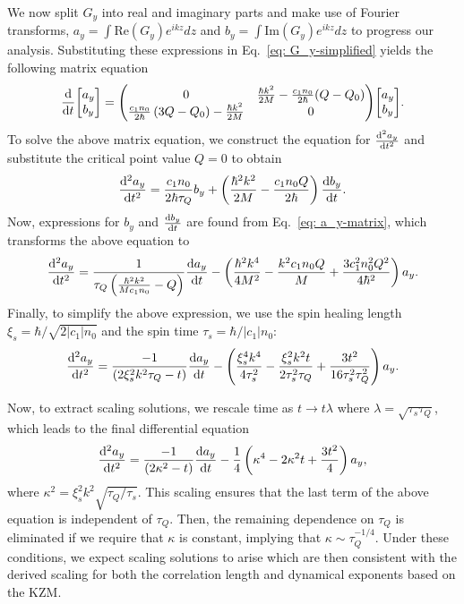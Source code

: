 We now split \(G_y\) into real and imaginary parts and make use of Fourier
transforms, \(a_y=\int \text{Re}(G_y)e^{ikz} dz\) and
\(b_y=\int \text{Im}(G_y)e^{ikz} dz\) to progress our analysis.
Substituting these expressions in Eq.~\eqref{eq: G_y-simplified} yields the
following matrix equation
\begin{align}\label{eq: a_y-matrix}
    \dv{t}\mqty[a_y \\ b_y] = \mqty(0 & \frac{\hbar k^2}{2M}
    - \frac{c_1  n_0}{2\hbar}(Q - Q_0) \\
    \frac{c_1  n_0}{2\hbar} \left( 3Q-Q_0 \right)-\frac{\hbar k^2}{2M} & 0)
    \mqty[a_y \\ b_y].
 \end{align}
To solve the above matrix equation, we construct the equation for
\(\dv[2]{a_y}{t}\) and substitute the critical point value \(Q=0\) to obtain
\begin{align}
    \dv[2]{a_y}{t} = \frac{c_1n_0}{2\hbar\tau_Q}b_y
    + \left(\frac{\hbar^2k^2}{2M} - \frac{c_1n_0Q}{2\hbar}\right)\dv{b_y}{t}.
\end{align}
Now, expressions for \(b_y\) and \(\dv{b_y}{t}\) are found from
Eq.~\eqref{eq: a_y-matrix}, which transforms the above equation to
\begin{align}
    \dv[2]{a_y}{t} = \frac{1}{\tau_Q\left(\frac{\hbar^2k^2}{Mc_1n_0}
    - Q\right)}\dv{a_y}{t}
    - \left(\frac{\hbar^2k^4}{4M^2} - \frac{k^2c_1n_0Q}{M}
    + \frac{3c_1^2n_0^2Q^2}{4\hbar^2}\right)a_y.
\end{align}
Finally, to simplify the above expression, we use the spin healing length
\(\xi_s = \hbar/\sqrt{2|c_1|n_0}\) and the spin time \(\tau_s=\hbar/|c_1|n_0\):
\begin{align}
  \dv[2]{a_y}{t} = \frac{-1}{\left(2\xi_s^2 k^2 \tau_Q- t \right)}\dv{a_y}{t}
  -\left( \frac{\xi_s^4 k^4}{4\tau_s^2} -\frac{\xi_s^2 k^2 t}{2\tau_s^2 \tau_Q}
  + \frac{3 t^2}{16\tau_s^2 \tau_Q^2} \right) a_y.
\end{align}

Now, to extract scaling solutions, we rescale time as \(t\rightarrow t\lambda \)
where \(\lambda = \sqrt{\tau_s\tau_Q}\), which leads to the final differential
equation
\begin{align} \label{eq: eqn-scaled-lin}
    \dv[2]{a_y}{t} = \frac{-1}{\left( 2\kappa^2 - t\right)}\dv{a_y}{t}
    -\frac{1}{4} \left( \kappa^4 - 2\kappa^2 t + \frac{3 t^2}{4} \right)a_y,
\end{align}
where \(\kappa^2 = \xi_s^2 k^2 \sqrt{\tau_Q/\tau_s}\).
This scaling ensures that the last term of the above equation is independent of
\(\tau_Q\).
Then, the remaining dependence on \(\tau_Q\) is eliminated if we require that
\(\kappa \) is constant, implying that \(\kappa \sim \tau_Q^{-1/4}\).
Under these conditions, we expect scaling solutions to arise which are then
consistent with the derived scaling for both the correlation length and
dynamical exponents based on the KZM\@.

